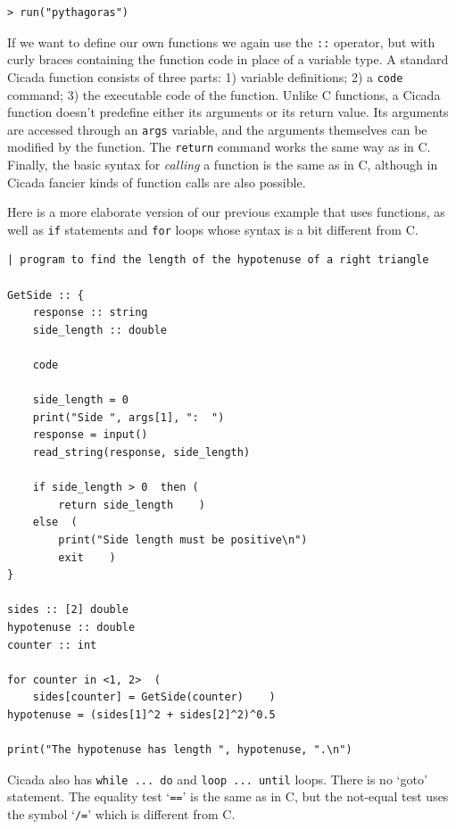 \documentclass{article}
\newenvironment{code}{
       \begin{list}{}{
               \setlength{\leftmargin}{.4in}
               \setlength{\rightmargin}{0in}
               \setlength{\topsep}{.2in}
       }
       \small
       \item[] }
       { \end{list}   }
\begin{document}
\begin{code} \begin{verbatim}
> run("pythagoras")
\end{verbatim} \end{code}

If we want to define our own functions we again use the \verb#::# operator, but with curly braces containing the function code in place of a variable type.  A standard Cicada function consists of three parts:  1) variable definitions; 2) a \verb#code# command; 3) the executable code of the function.  Unlike C functions, a Cicada function doesn't predefine either its arguments or its return value.  Its arguments are accessed through an \verb#args# variable, and the arguments themselves can be modified by the function.  The \verb#return# command works the same way as in C.  Finally, the basic syntax for \emph{calling} a function is the same as in C, although in Cicada fancier kinds of function calls are also possible.

Here is a more elaborate version of our previous example that uses functions, as well as \verb#if# statements and \verb#for# loops whose syntax is a bit different from C.

\begin{code} \begin{verbatim}
| program to find the length of the hypotenuse of a right triangle

GetSide :: {
    response :: string
    side_length :: double
    
    code
    
    side_length = 0
    print("Side ", args[1], ":  ")
    response = input()
    read_string(response, side_length)
    
    if side_length > 0  then (
        return side_length    )
    else  (
        print("Side length must be positive\n")
        exit    )
}

sides :: [2] double
hypotenuse :: double
counter :: int

for counter in <1, 2>  (
    sides[counter] = GetSide(counter)    )
hypotenuse = (sides[1]^2 + sides[2]^2)^0.5

print("The hypotenuse has length ", hypotenuse, ".\n")
\end{verbatim} \end{code}

Cicada also has \texttt{while ... do} and \verb#loop ... until# loops.  There is no `goto' statement.  The equality test `\verb#==#' is the same as in C, but the not-equal test uses the symbol `\verb#/=#' which is different from C.
\end{document}
